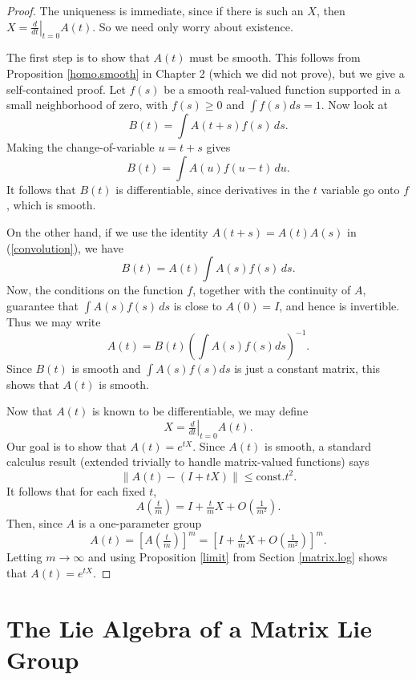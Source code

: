 \documentclass[12pt]{amsbook}
\theoremstyle{plain}
\numberwithin{equation}{chapter}
\numberwithin{theorem}{chapter}
\begin{document}
\begin{proof}
The uniqueness is immediate, since if there is such an $X$, then $X=\left.
\frac{d}{dt}\right|  _{t=0}A(t)$. So we need only worry about existence.

The first step is to show that $A(t)$ must be smooth. This follows from
Proposition \ref{homo.smooth} in Chapter 2 (which we did not prove), but we
give a self-contained proof. Let $f(s)$ be a smooth real-valued function
supported in a small neighborhood of zero, with $f(s)\geq0$ and $\int
f(s)ds=1$. Now look at
\begin{equation}
B(t)=\int A(t+s)f(s)\,ds\text{.}\label{convolution}%
\end{equation}
Making the change-of-variable $u=t+s$ gives
\[
B(t)=\int A(u)f(u-t)\,du\text{.}%
\]
It follows that $B(t)$ is differentiable, since derivatives in the $t$
variable go onto $f$, which is smooth.

On the other hand, if we use the identity $A(t+s)=A(t)A(s)$ in
(\ref{convolution}), we have
\[
B(t)=A(t)\int A(s)f(s)\,ds\text{.}%
\]
Now, the conditions on the function $f$, together with the continuity of $A$,
guarantee that $\int A(s)f(s)\,ds$ is close to $A(0)=I$, and hence is
invertible. Thus we may write
\begin{equation}
A(t)=B(t)\left(  \int A(s)f(s)ds\right)  ^{-1}\text{.}\label{smooth}%
\end{equation}
Since $B\left(  t\right)  $ is smooth and $\int A(s)f(s)ds$ is just a constant
matrix, this shows that $A\left(  t\right)  $ is smooth.

Now that $A(t)$ is known to be differentiable, we may define
\[
X=\left.  \tfrac{d}{dt}\right|  _{t=0}A(t)\text{.}%
\]
Our goal is to show that $A(t)=e^{tX}$. Since $A(t)$ is smooth, a standard
calculus result (extended trivially to handle matrix-valued functions) says
\[
\left\|  A(t)-(I+tX)\right\|  \leq\mathrm{const.}t^{2}\text{.}%
\]
It follows that for each fixed $t$,
\[
A\left(  \tfrac{t}{m}\right)  =I+\tfrac{t}{m}X+O\left(  \tfrac{1}{m^{2}%
}\right)  \text{.}%
\]
Then, since $A$ is a one-parameter group
\[
A(t)=\left[  A\left(  \tfrac{t}{m}\right)  \right]  ^{m}=\left[  I+\tfrac
{t}{m}X+O\left(  \tfrac{1}{m^{2}}\right)  \right]  ^{m}\text{.}%
\]
Letting $m\rightarrow\infty$ and using Proposition \ref{limit} from Section
\ref{matrix.log} shows that $A(t)=e^{tX}$.
\end{proof}

\section{The Lie Algebra of a Matrix Lie Group\label{lie.algebra}}
\end{document}
